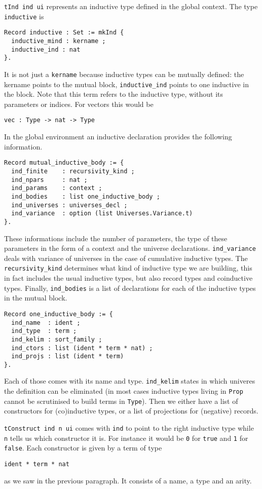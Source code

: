 \texttt{tInd ind ui} represents an inductive type defined in the global
context. The type \texttt{inductive} is
\begin{verbatim}
Record inductive : Set := mkInd {
  inductive_mind : kername ;
  inductive_ind : nat
}.
\end{verbatim}
It is not just a \texttt{kername} because inductive types can be
mutually defined: the kername points to the mutual block,
\texttt{inductive_ind} points to one inductive in the block.
Note that this term refers to the inductive type, without its parameters or
indices. For vectors this would be
\begin{verbatim}
vec : Type -> nat -> Type
\end{verbatim}
In the global environment an inductive declaration provides the following
information.
\begin{verbatim}
Record mutual_inductive_body := {
  ind_finite    : recursivity_kind ;
  ind_npars     : nat ;
  ind_params    : context ;
  ind_bodies    : list one_inductive_body ;
  ind_universes : universes_decl ;
  ind_variance  : option (list Universes.Variance.t)
}.
\end{verbatim}
These informations include the number of parameters, the type of these
parameters in the form of a context and the universe declarations.
\texttt{ind_variance} deals with variance of universes in the case
of cumulative inductive types.
The \texttt{recursivity_kind} determines what kind of inductive type
we are building, this in fact includes the usual inductive types, but also
record types and coinductive types.
Finally, \texttt{ind_bodies} is a list of declarations for each of
the inductive types in the mutual block.
\begin{verbatim}
Record one_inductive_body := {
  ind_name  : ident ;
  ind_type  : term ;
  ind_kelim : sort_family ;
  ind_ctors : list (ident * term * nat) ;
  ind_projs : list (ident * term)
}.
\end{verbatim}
Each of those comes with its name and type.
\texttt{ind_kelim} states in which univeres the definition can be
eliminated (in most cases inductive types living in \texttt{Prop}
cannot be scrutinised to build terms in \texttt{Type}).
Then we either have a list of constructors for (co)inductive types, or a list
of projections for (negative) records.


\texttt{tConstruct ind n ui} comes with \texttt{ind} to point
to the right inductive type while \texttt{n} tells us which constructor
it is.
For instance it would be \texttt{0} for \texttt{true} and
\texttt{1} for \texttt{false}.
Each constructor is given by a term of type
\begin{verbatim}
ident * term * nat
\end{verbatim}
as we saw in the previous paragraph. It consists of a name, a type and an arity.

